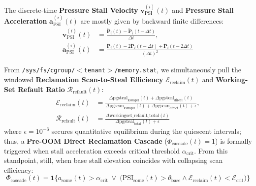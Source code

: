 \documentclass[pdflatex,sn-mathphys,Numbered]{sn-jnl}
\begin{document}
The discrete-time \textbf{Pressure Stall Velocity} $\mathbf{v}_{\text{PSI}}^{(i)}(t)$ and \textbf{Pressure Stall Acceleration} $\mathbf{a}_{\text{PSI}}^{(i)}(t)$ are mostly given by backward finite differences:
\begin{equation}
\begin{aligned}
\mathbf{v}_{\text{PSI}}^{(i)}(t) &= \frac{\tilde{\mathbf{P}}_i(t) - \tilde{\mathbf{P}}_i(t - \Delta t)}{\Delta t}, \\
\mathbf{a}_{\text{PSI}}^{(i)}(t) &= \frac{\tilde{\mathbf{P}}_i(t) - 2\tilde{\mathbf{P}}_i(t - \Delta t) + \tilde{\mathbf{P}}_i(t - 2\Delta t)}{(\Delta t)^2}
\end{aligned}
\label{eq:kinematics}
\end{equation}

From \texttt{/sys/fs/cgroup/$<$tenant$>$/memory.stat}, we simultaneously pull the windowed \textbf{Reclamation Scan-to-Steal Efficiency} $\mathcal{E}_{\text{reclaim}}(t)$ and \textbf{Working-Set Refault Ratio} $\mathcal{R}_{\text{refault}}(t)$:
\begin{equation}
\begin{aligned}
\mathcal{E}_{\text{reclaim}}(t) &= \frac{\Delta \text{pgsteal}_{\text{kswapd}}(t) + \Delta \text{pgsteal}_{\text{direct}}(t)}{\Delta \text{pgscan}_{\text{kswapd}}(t) + \Delta \text{pgscan}_{\text{direct}}(t) + \epsilon}, \\
\mathcal{R}_{\text{refault}}(t) &= \frac{\Delta \text{workingset\_refault\_total}(t)}{\Delta \text{pgsteal}_{\text{total}}(t) + \epsilon}
\end{aligned}
\label{eq:scan_efficiency}
\end{equation}
where $\epsilon = 10^{-6}$ secures quantitative equilibrium during the quiescent intervals; thus, a \textbf{Pre-OOM Direct Reclamation Cascade} ($\Phi_{\text{cascade}}(t) = 1$) is formally triggered when stall acceleration exceeds critical threshold $\alpha_{\text{crit}}$. From this standpoint, still, when base stall elevation coincides with collapsing scan efficiency:
\begin{equation}
\Phi_{\text{cascade}}(t) = \mathbf{1}\Big\{ a_{\text{some}}(t) > \alpha_{\text{crit}} \; \lor \; \big(\text{PSI}_{\text{some}}(t) > \theta_{\text{base}} \land \mathcal{E}_{\text{reclaim}}(t) < \mathcal{E}_{\text{crit}}\big) \Big\}
\label{eq:cascade_trigger}
\end{equation}
\end{document}
